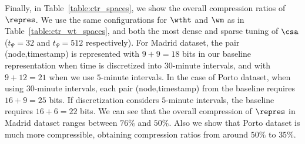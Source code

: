 Finally, in Table~\ref{table:ctr_spaces}, we show the overall compression ratios of  $\repres$.
We use the same configurations for $\wtht$ and $\wm$  as in Table~\ref{table:ctr_wt_spaces}, and both the
most dense and sparse tuning of $\csa$ ($t_{\Psi}= 32$ and $t_{\Psi}= 512$ respectively).
For Madrid dataset, the pair (node,timestamp) is represented with $9+9=18$ bits in our baseline representation 
when time is discretized into $30$-minute intervals, and with $9+12=21$ when we use $5$-minute intervals.
In the case of Porto dataset, when using $30$-minute intervals, each pair (node,timestamp) from the baseline requires $16+9=25$ bits. 
If discretization considers $5$-minute intervals, the baseline requires $16+6=22$ bits. We can see that the overall
compression of $\repres$ in Madrid dataset ranges between $76\%$ and $50\%$. Also we show that Porto dataset is much
more compressible, obtaining compression ratios from around $50\%$ to $35\%$.



